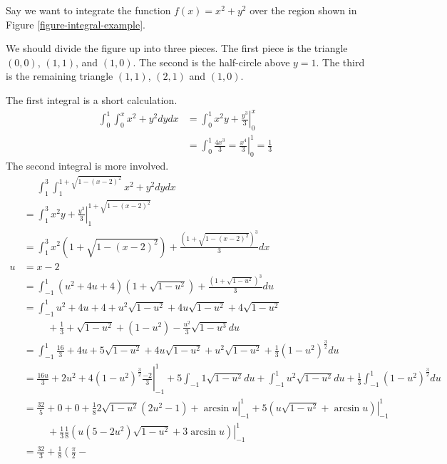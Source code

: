 \documentclass[fleqn,letterpaper]{report}
\begin{document}
\begin{example}
Say we want to integrate the function $f(x) = x^2 + y^2$ over
the region shown in Figure \ref{figure-integral-example}.

We should divide the figure up into three pieces. The first
piece is the triangle $(0,0)$, $(1,1)$, and $(1,0)$. The
second is the half-circle above $y=1$. The third is the
remaining triangle $(1,1)$, $(2,1)$ and $(1,0)$.

The first integral is a short calculation.
\begin{align*}
\int_0^1 \int_0^x x^2 + y^2 dy dx & = \int_0^1 \left. x^2y +
\frac{y^3}{3} \right|_0^x \\
& = \int_0^1 \frac{4x^3}{3} = \left. \frac{x^4}{3} \right|_0^1
= \frac{1}{3} 
\end{align*}
The second integral is more involved. 
\begin{align*}
& \phantom{=} \int_1^3 \int_1^{1+\sqrt{1-(x-2)^2}} x^2 + y^2
dy dx \\
& =
\int_1^3 \left. x^2y + \frac{y^3}{3}
\right|_1^{1+\sqrt{1-(x-2)^2}} \\
& = \int_1^3 x^2 (1 + \sqrt{1-(x-2)^2}) +
\frac{(1+\sqrt{1-(x-2)^2})^3}{3} dx \\
u & = x-2 \\
& = \int_{-1}^1 (u^2 + 4u + 4) (1 + \sqrt{1-u^2}) + \frac{(1 +
\sqrt{1-u^2})^3}{3} du \\
& = \int_{-1}^1 u^2 + 4u + 4 + u^2 \sqrt{1-u^2} + 4u
\sqrt{1-u^2} + 4 \sqrt{1-u^2} \\
& \hspace{1cm} + \frac{1}{3} + \sqrt{1-u^2} +
(1-u^2) - \frac{u^2}{3} \sqrt{1-u^3} du \\
&= \int_{-1}^1 \frac{16}{3} + 4u + 5 \sqrt{1-u^2} +
4u \sqrt{1-u^2} + u^2 \sqrt{1-u^2} + \frac{1}{3}
(1-u^2)^{\frac{3}{2}} du \\
& = \frac{16u}{3} + 2u^2 + \left. 4 (1-u^2)^\frac{3}{2}
\frac{-2}{3} \right|_{-1}^1 + 5 \int_{-1}{1} \sqrt{1-u^2} du +
\int_{-1}^1 u^2 \sqrt{1-u^2} du + \frac{1}{3} \int_{-1}^1
(1-u^2)^{\frac{3}{2}} du \\
& = \frac{32}{5} + 0 + 0 + \left. \frac{1}{8} 2
\sqrt{1-u^2}(2u^2-1) + \arcsin u \right|_{-1}^1 + \left. 5 (u
\sqrt{1-u^2} + \arcsin u) \right|_{-1}^1 \\
& \hspace{1cm} + \left. \frac{1}{3}
\frac{1}{8} (u(5-2u^2)\sqrt{1-u^2} + 3 \arcsin u )
\right|_{-1}^1 \\
& = \frac{32}{3} + \frac{1}{8} \left( \frac{\pi}{2} -

\end{align*}
\end{example}
\end{document}
